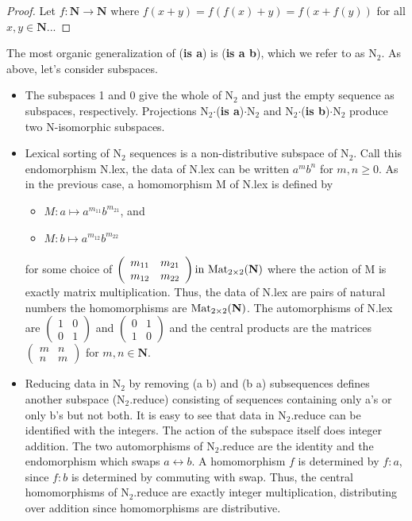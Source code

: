 \documentclass[11pt]{article}
\begin{document}
\begin{proof}
Let $f:{\mathbf N}\rightarrow{\mathbf N}$ where $f(x+y)=f(f(x)+y)=f(x+f(y))$ for all $x,y\in\mathbf N$...
\end{proof}

The most organic generalization of ({\bf is a}) is ({\bf is a b}), which we refer to as N$_2$.  As above, let's consider subspaces.  

\begin{itemize}
\item{The subspaces 1 and 0 give the whole of N$_2$ and just the empty sequence as subspaces, respectively.  
Projections N$_2$$\cdot$({\bf is a})$\cdot$N$_2$ and N$_2$$\cdot$({\bf is b})$\cdot$N$_2$ produce two N-isomorphic subspaces.}
\item{Lexical sorting of N$_2$ sequences is a non-distributive subspace of N$_2$.  Call this endomorphism N.lex, the data of N.lex 
can be written $a^m b^n$ for $m,n\ge 0$.  As in the previous case, a homomorphism M of N.lex is defined by  
\begin{itemize}
\item [] $M: a\mapsto a^{m_{11}} b^{m_{21}}$, and 
\item [] $M: b\mapsto a^{m_{12}} b^{m_{22}}$ 
\end{itemize}
for some choice of 
$
\left (
\begin{array}{cc} 
m_{11} & m_{21} \\ m_{12} & m_{22}  
\end{array}
\right ) 
{\rm in}\ {\rm Mat}_{2\times2}(\mathbf N)
$
where the action of M is exactly matrix multiplication.  Thus, the data of N.lex are pairs of natural numbers the 
homomorphisms are ${\rm Mat}_{2\times2}(\mathbf N)$.  The automorphisms of N.lex are 
$
\left (
\begin{array}{cc} 
1 & 0 \\ 0 & 1 
\end{array}
\right ) 
$
and 
$
\left (
\begin{array}{cc} 
0 & 1 \\ 1 & 0 
\end{array}
\right ) 
$
and the central products are the matrices 
$
\left (
\begin{array}{cc} 
m & n \\ n & m 
\end{array}
\right ) 
$
for $m,n\in\mathbf N$.


}
\item{Reducing data in N$_2$ by removing (a b) and (b a) subsequences defines another subspace (N$_2$.reduce) consisting of 
sequences containing only a's or only b's but not both.  It is easy to see that data in N$_2$.reduce can be identified with the 
integers.  The action of the subspace itself does integer addition.  
The two automorphisms of N$_2$.reduce are the identity and the endomorphism which 
swaps $a\leftrightarrow b$.  A homomorphism $f$ is determined by $f:a$, since $f:b$ is determined by commuting with swap. 
Thus, the central homomorphisms of N$_2$.reduce are exactly integer multiplication, distributing over addition since homomorphisms are 
distributive.  

} 
\end{itemize}
\end{document}
